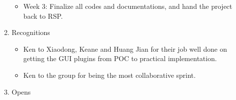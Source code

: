 \documentclass{letter}
\begin{document}
\begin{enumerate}
\begin{itemize}
            \item Week 3: Finalize all codes and documentations, and hand the project back to RSP.
        \end{itemize}
    \item Recognitions
        \begin{itemize}
            \item Ken to Xiaodong, Keane and Huang Jian for their job well done on getting the GUI plugins from POC to practical implementation. 
            \item Ken to the group for being the most collaborative sprint. 
        \end{itemize}
    \item Opens
\end{enumerate}
\end{document}
